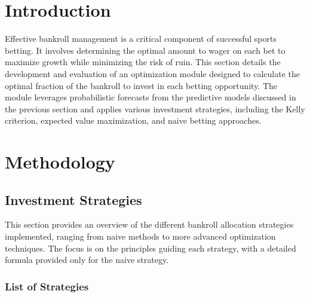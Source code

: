 \section{Introduction}

Effective bankroll management is a critical component of successful sports betting. It involves determining the optimal amount to wager on each bet to maximize growth while minimizing the risk of ruin. This section details the development and evaluation of an optimization module designed to calculate the optimal fraction of the bankroll to invest in each betting opportunity. The module leverages probabilistic forecasts from the predictive models discussed in the previous section and applies various investment strategies, including the Kelly criterion, expected value maximization, and naive betting approaches.

\section{Methodology}
\subsection{Investment Strategies}

This section provides an overview of the different bankroll allocation strategies implemented, ranging from naive methods to more advanced optimization techniques. The focus is on the principles guiding each strategy, with a detailed formula provided only for the naive strategy.

\subsubsection{List of Strategies}

